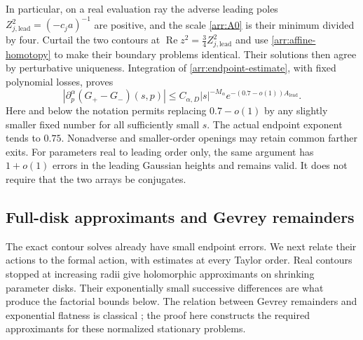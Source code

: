 In particular, on a real evaluation ray the adverse leading poles
\(Z_{j,\mathrm{lead}}^2=(-c_ja)^{-1}\) are positive, and the scale
\eqref{arr:A0} is their minimum divided by four.
Curtail the two contours at
\(\operatorname{Re}z^2=\tfrac34 Z_{j,\mathrm{lead}}^2\) and use
\eqref{arr:affine-homotopy} to make their boundary problems
identical.  Their solutions then agree by perturbative uniqueness.
Integration of \eqref{arr:endpoint-estimate}, with fixed
polynomial losses, proves
\begin{equation}\label{arr:fixed-parameter-comparison}
 |\partial_p^\alpha(G_+-G_-)(s,p)|
 \le C_{\alpha,D}|s|^{-M_\alpha}
          e^{-(0.7-o(1))A_{\mathrm{lead}}}.
\end{equation}
Here and below the notation permits replacing \(0.7-o(1)\)
by any slightly smaller fixed number for all sufficiently
small \(s\).  The actual endpoint exponent tends to \(0.75\).
Nonadverse and smaller-order openings may retain common
farther exits.  For parameters real to leading order only,
the same argument has \(1+o(1)\) errors in the leading
Gaussian heights and remains valid.  It does not require
that the two arrays be conjugates.

\subsection{Full-disk approximants and Gevrey remainders}

The exact contour solves already have small endpoint errors.  We next
relate their actions to the formal action, with estimates at every Taylor
order.  Real contours stopped at increasing radii give holomorphic
approximants on shrinking parameter disks.  Their exponentially small
successive differences are what produce the factorial bounds below.
The relation between Gevrey remainders and exponential flatness is
classical \cite[Sections~1.3--1.6]{MR1992}; the proof here constructs
the required approximants for these normalized stationary problems.

